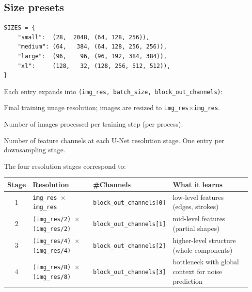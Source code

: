 \documentclass[11pt]{article}
\newcommand{\code}[1]{\texttt{#1}}
\begin{document}
\subsection{Size presets}

\begin{lstlisting}
SIZES = {
    "small":  (28,  2048, (64, 128, 256)),
    "medium": (64,   384, (64, 128, 256, 256)),
    "large":  (96,    96, (96, 192, 384, 384)),
    "xl":     (128,   32, (128, 256, 512, 512)),
}
\end{lstlisting}

Each entry expands into \code{(img\_res, batch\_size, block\_out\_channels)}:
\begin{description}[style=nextline,leftmargin=1.5em]
  \item[\code{img\_res}] Final training image resolution; images are resized
    to \code{img\_res$\times$img\_res}.
  \item[\code{batch\_size}] Number of images processed per training step
    (per process).
  \item[\code{block\_out\_channels}] Number of feature channels at each U-Net
    resolution stage. One entry per downsampling stage.
\end{description}

The four resolution stages correspond to:

\begin{center}\small
\begin{tabular}{c l l l}
\textbf{Stage} & \textbf{Resolution} & \textbf{\#Channels} & \textbf{What it learns} \\
\hline
1 & \code{img\_res $\times$ img\_res}            & \code{block\_out\_channels[0]} & low-level features (edges, strokes) \\
2 & \code{(img\_res/2) $\times$ (img\_res/2)}    & \code{block\_out\_channels[1]} & mid-level features (partial shapes) \\
3 & \code{(img\_res/4) $\times$ (img\_res/4)}    & \code{block\_out\_channels[2]} & higher-level structure (whole components) \\
4 & \code{(img\_res/8) $\times$ (img\_res/8)}    & \code{block\_out\_channels[3]} & bottleneck with global context for noise prediction \\
\end{tabular}
\end{center}
\end{document}
